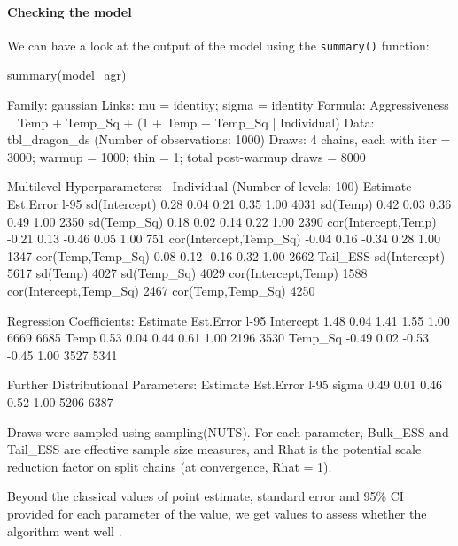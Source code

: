 \documentclass[a4paper,12pt,twoside]{article}
\begin{document}
\paragraph{Checking the model}
We can have a look at the output of the model using the \texttt{summary()} function:
\begin{Rinput}
summary(model_agr)
\end{Rinput}
\begin{Routput}
 Family: gaussian 
  Links: mu = identity; sigma = identity 
Formula: Aggressiveness ~ Temp + Temp_Sq + (1 + Temp + Temp_Sq | Individual) 
   Data: tbl_dragon_ds (Number of observations: 1000) 
  Draws: 4 chains, each with iter = 3000; warmup = 1000; thin = 1;
         total post-warmup draws = 8000

Multilevel Hyperparameters:
~Individual (Number of levels: 100) 
                       Estimate Est.Error l-95%
sd(Intercept)              0.28      0.04     0.21     0.35 1.00     4031
sd(Temp)                   0.42      0.03     0.36     0.49 1.00     2350
sd(Temp_Sq)                0.18      0.02     0.14     0.22 1.00     2390
cor(Intercept,Temp)       -0.21      0.13    -0.46     0.05 1.00      751
cor(Intercept,Temp_Sq)    -0.04      0.16    -0.34     0.28 1.00     1347
cor(Temp,Temp_Sq)          0.08      0.12    -0.16     0.32 1.00     2662
                       Tail_ESS
sd(Intercept)              5617
sd(Temp)                   4027
sd(Temp_Sq)                4029
cor(Intercept,Temp)        1588
cor(Intercept,Temp_Sq)     2467
cor(Temp,Temp_Sq)          4250

Regression Coefficients:
          Estimate Est.Error l-95%
Intercept     1.48      0.04     1.41     1.55 1.00     6669     6685
Temp          0.53      0.04     0.44     0.61 1.00     2196     3530
Temp_Sq      -0.49      0.02    -0.53    -0.45 1.00     3527     5341

Further Distributional Parameters:
      Estimate Est.Error l-95%
sigma     0.49      0.01     0.46     0.52 1.00     5206     6387

Draws were sampled using sampling(NUTS). For each parameter, Bulk_ESS
and Tail_ESS are effective sample size measures, and Rhat is the potential
scale reduction factor on split chains (at convergence, Rhat = 1).
\end{Routput}
Beyond the classical values of point estimate, standard error and 95\% CI provided for each parameter of the value, we get values to assess whether the algorithm went well \autocite{vehtari_ranknormalization_2021}.
\end{document}
